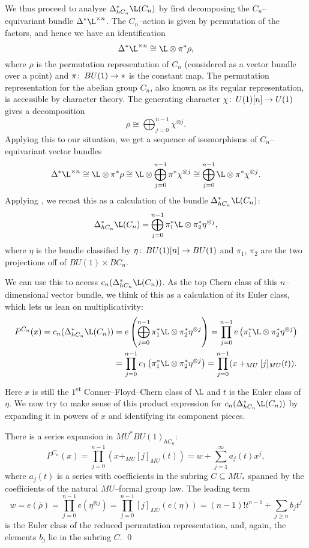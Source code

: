 We thus proceed to analyze \(\Delta^*_{hC_n} \L(C_n)\) by first decomposing the \(C_n\)--equivariant bundle \(\Delta^* \L^{\times n}\).  The \(C_n\)--action is given by permutation of the factors, and hence we have an identification \[\Delta^* \L^{\times n} \cong \L \otimes \pi^* \rho,\] where \(\rho\) is the permutation representation of \(C_n\) (considered as a vector bundle over a point) and \(\pi\colon\thinspace BU(1) \to *\) is the constant map.  The permutation representation for the abelian group \(C_n\), also known as its regular representation, is accessible by character theory.  The generating character \(\chi\colon\thinspace U(1)[n] \to U(1)\) gives a decomposition \[\rho \cong \bigoplus_{j=0}^{n-1} \chi^{\otimes j}.\]  Applying this to our situation, we get a sequence of isomorphisms of \(C_n\)--equivariant vector bundles \[\Delta^* \L^{\times n} \cong \L \otimes \pi^* \rho \cong \L \otimes \bigoplus_{j=0}^{n-1} \pi^* \chi^{\otimes j} \cong \bigoplus_{j=0}^{n-1} \L \otimes \pi^* \chi^{\otimes j}.\]  Applying , we recast this as a calculation of the bundle \(\Delta_{hC_n}^* \L(C_n)\): \[\Delta_{hC_n}^* \L(C_n) = \bigoplus_{j=0}^{n-1} \pi_1^* \L \otimes \pi_2^* \eta^{\otimes j},\] where \(\eta\) is the bundle classified by \(\eta\colon\thinspace BU(1)[n] \to BU(1)\) and \(\pi_1\), \(\pi_2\) are the two projections off of \(BU(1) \times BC_n\).

We can use this to access \(c_n(\Delta_{hC_n}^* \L(C_n))\).  As the top Chern class of this \(n\)--dimensional vector bundle, we think of this as a calculation of its Euler class, which lets us lean on multiplicativity:
\begin{align*}
P^{C_n}(x) = c_n(\Delta_{hC_n}^* \L(C_n)) & = e\left( \bigoplus_{j=0}^{n-1} \pi_1^* \L \otimes \pi_2^* \eta^{\otimes j} \right)
= \prod_{j=0}^{n-1} e\left( \pi_1^* \L \otimes \pi_2^* \eta^{\otimes j} \right) \\
& = \prod_{j=0}^{n-1} c_1\left( \pi_1^* \L \otimes \pi_2^* \eta^{\otimes j} \right)
= \prod_{j=0}^{n-1} (x +_{MU} [j]_{MU}(t)).
\end{align*}
Here \(x\) is still the \(1\)\textsuperscript{st} Conner--Floyd--Chern class of \(\L\) and \(t\) is the Euler class of \(\eta\).  We now try to make sense of this product expression for \(c_n(\Delta_{hC_n}^* \L(C_n))\) by expanding it in powers of \(x\) and identifying its component pieces.
\begin{lemma}\label{AjAndBjAreInTheFGLSubring}
There is a series expansion in \(MU^* BU(1)_{hC_n}\): \[P^{C_n}(x) = \prod_{j=0}^{n-1} (x +_{MU} [j]_{MU}(t)) = w + \sum_{j=1}^\infty a_j(t) x^j,\] where \(a_j(t)\) is a series with coefficients in the subring \(C \subseteq MU_*\) spanned by the coefficients of the natural \(MU\)--formal group law.  The leading term \[w = e(\overline \rho) = \prod_{j=0}^{n-1} e(\eta^{\otimes j}) = \prod_{j=0}^{n-1} [j]_{MU} (e(\eta)) = (n-1)! t^{n-1} + \sum_{j \ge n} b_j t^j\] is the Euler class of the reduced permutation representation, and, again, the elements \(b_j\) lie in the subring \(C\). \qed
\end{lemma}


